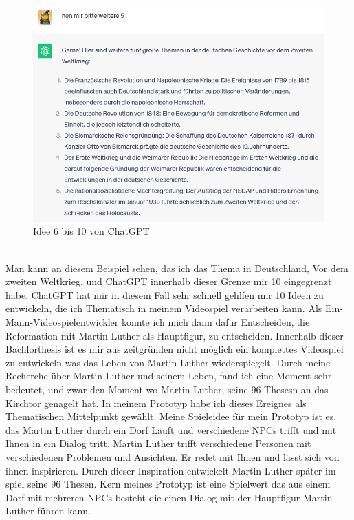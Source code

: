 \documentclass[12pt,a4paper,bibliography=totocnumbered,listof=totocnumbered]{scrartcl}
\begin{document}
\begin{figure}[h]
	\centering
	\includegraphics[scale=0.7]{BilderFuerBA/ChatGPT5Themen2.png}
	\caption{Idee 6 bis 10 von ChatGPT}
	\label{fig:Zweiten-Fünf-Idenn}
\end{figure}
\\


Man kann an diesem Beispiel sehen, das ich das Thema in Deutschland, Vor dem zweiten Weltkrieg. und ChatGPT innerhalb dieser Grenze mir 10 eingegrenzt habe.
ChatGPT hat mir in diesem Fall sehr schnell gehlfen mir 10 Ideen zu entwickeln, die ich Thematisch in meinem Videospiel verarbeiten kann. Als Ein-Mann-Videospielentwickler konnte ich mich dann dafür Entscheiden, die Reformation mit Martin Luther als Hauptfigur, zu entscheiden.
Innerhalb dieser Bachlorthesis ist es mir aus zeitgründen nicht möglich ein komplettes Videospiel zu entwickeln was das Leben von Martin Luther wiederspiegelt. Durch meine Recherche über Martin Luther und seinem Leben, fand ich eine Moment sehr bedeutet, und zwar den Moment wo Martin Luther, seine 96 Thesesn an das Kirchtor genagelt hat.
In meinem Prototyp habe ich dieses Ereignes als Thematischen Mittelpunkt gewählt.
Meine Spieleidee für mein Prototyp ist es, das Martin Luther durch ein Dorf Läuft und verschiedene NPCs trifft und mit Ihnen in ein Dialog tritt. Martin Luther trifft verschiedene Personen mit verschiedenen Problemen und Ansichten. Er redet mit Ihnen und lässt sich von ihnen inspirieren. Durch dieser Inspiration entwickelt Martin Luther später im spiel seine 96 Thesen.
Kern meines Prototyp ist eine Spielwert das aus einem Dorf mit mehreren NPCs besteht die einen Dialog mit der Hauptfigur Martin Luther führen kann.
\end{document}

